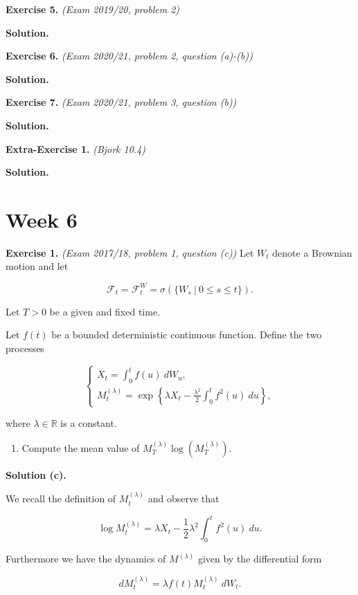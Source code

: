 \documentclass[a4paper,12pt,openany]{book}
\providecommand{\tightlist}{%
 \setlength{\itemsep}{0pt}\setlength{\parskip}{0pt}}
\begin{document}
\textbf{Exercise 5.} \emph{(Exam 2019/20, problem 2)}

\textbf{Solution.}

\textbf{Exercise 6.} \emph{(Exam 2020/21, problem 2, question (a)-(b))}

\textbf{Solution.}

\textbf{Exercise 7.} \emph{(Exam 2020/21, problem 3, question (b))}

\textbf{Solution.}

\textbf{Extra-Exercise 1.} \emph{(Bjork 10.4)}

\textbf{Solution.}

\hypertarget{week-6}{%
\section{Week 6}\label{week-6}}

\textbf{Exercise 1.} \emph{(Exam 2017/18, problem 1, question (c))} Let \(W_t\) denote a Brownian motion and let

\[
\mathcal{F}_t=\mathcal{F}_t^W=\sigma(\{W_s\ \vert\ 0\le s\le t\}).
\]

Let \(T>0\) be a given and fixed time.

Let \(f(t)\) be a bounded deterministic continuous function. Define the two processes

\[
\begin{cases}
X_t=\int_0^tf(u)\ dW_u,\\
M^{(\lambda)}_t=\exp\left\{\lambda X_t-\frac{\lambda^2}{2}\int_0^t f^2(u)\ du\right\},
\end{cases}
\]

where \(\lambda\in\mathbb{R}\) is a constant.

\begin{enumerate}
\def\labelenumi{\alph{enumi}.}
\setcounter{enumi}{2}
\tightlist
\item
  Compute the mean value of \(M^{(\lambda)}_T\log(M^{(\lambda)}_T)\).
\end{enumerate}

\textbf{Solution (c).}

We recall the definition of \(M_t^{(\lambda)}\) and observe that

\[
\log M_t^{(\lambda)}=\lambda X_t-\frac{1}{2}\lambda ^2\int_0^t f^2(u)\ du.
\]

Furthermore we have the dynamics of \(M^{(\lambda)}\) given by the differential form

\[
dM_t^{(\lambda)}=\lambda f(t)M_t^{(\lambda)}\ dW_t.
\]
\end{document}
